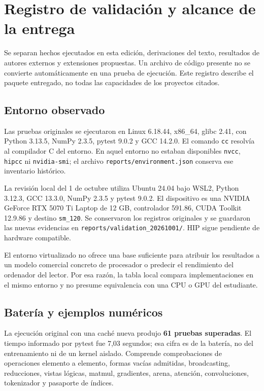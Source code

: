 \documentclass[12pt,a4paper,oneside]{report}
\begin{document}
\chapter{Registro de validación y alcance de la entrega}\label{app:validacion}
\begin{idea}
Se separan hechos ejecutados en esta edición, derivaciones del texto, resultados de autores externos y extensiones propuestas. Un archivo de código presente no se convierte automáticamente en una prueba de ejecución. Este registro describe el paquete entregado, no todas las capacidades de los proyectos citados.
\end{idea}

\section{Entorno observado}
Las pruebas originales se ejecutaron en Linux 6.18.44, x86\_64, glibc 2.41, con Python 3.13.5, NumPy 2.3.5, pytest 9.0.2 y GCC 14.2.0. El comando \texttt{cc} resolvía al compilador C del entorno. En aquel entorno no estaban disponibles \texttt{nvcc}, \texttt{hipcc} ni \texttt{nvidia-smi}; el archivo \texttt{reports/environment.json} conserva ese inventario histórico.

La revisión local del 1 de octubre utiliza Ubuntu 24.04 bajo WSL2, Python 3.12.3, GCC 13.3.0, NumPy 2.3.5 y pytest 9.0.2. El dispositivo es una NVIDIA GeForce RTX 5070 Ti Laptop de 12 GB, controlador 591.86, CUDA Toolkit 12.9.86 y destino \texttt{sm\_120}. Se conservaron los registros originales y se guardaron las nuevas evidencias en \texttt{reports/validation\_20261001/}. HIP sigue pendiente de hardware compatible.

El entorno virtualizado no ofrece una base suficiente para atribuir los resultados a un modelo comercial concreto de procesador o predecir el rendimiento del ordenador del lector. Por esa razón, la tabla local compara implementaciones en el mismo entorno y no presume equivalencia con una CPU o GPU del estudiante.

\section{Batería y ejemplos numéricos}
La ejecución original con una caché nueva produjo \textbf{61 pruebas superadas}. El tiempo informado por pytest fue 7,03 segundos; esa cifra es de la batería, no del entrenamiento ni de un kernel aislado. Comprende comprobaciones de operaciones elemento a elemento, formas vacías admitidas, broadcasting, reducciones, vistas lógicas, matmul, gradientes, arena, atención, convoluciones, tokenizador y pasaporte de índices.
\end{document}
